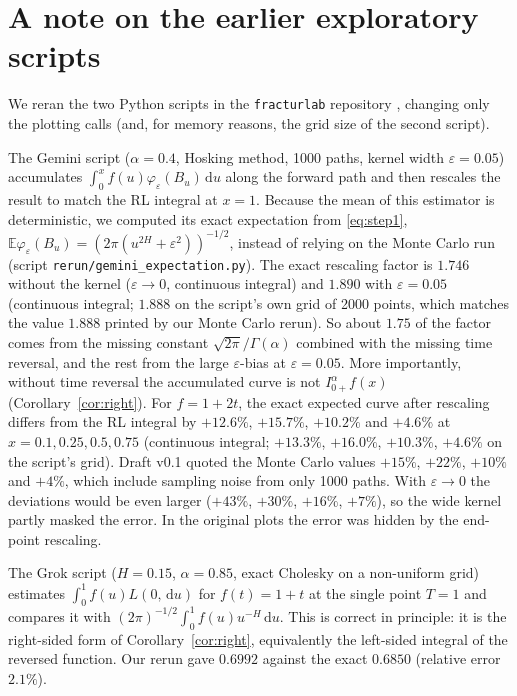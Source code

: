 \documentclass[11pt]{article}
\theoremstyle{remark}
\theoremstyle{definition}
\newcommand{\E}{\mathbb{E}}
\newcommand{\dd}{\,\mathrm{d}}
\newcommand{\Ia}{I^{\alpha}_{0+}}
\begin{document}
\section{A note on the earlier exploratory scripts}\label{sec:old}
We reran the two Python scripts in the \texttt{fracturlab} repository \cite{fracturlab}, changing only the plotting calls (and, for memory reasons, the grid size of the second script).

The Gemini script ($\alpha=0.4$, Hosking method, 1000 paths, kernel width $\varepsilon=0.05$) accumulates $\int_0^x f(u)\varphi_\varepsilon(B_u)\dd u$ along the forward path and then rescales the result to match the RL integral at $x=1$. Because the mean of this estimator is deterministic, we computed its exact expectation from \eqref{eq:step1}, $\E\varphi_\varepsilon(B_u)=(2\pi(u^{2H}+\varepsilon^2))^{-1/2}$, instead of relying on the Monte Carlo run (script \texttt{rerun/gemini\_expectation.py}). The exact rescaling factor is $1.746$ without the kernel ($\varepsilon\to0$, continuous integral) and $1.890$ with $\varepsilon=0.05$ (continuous integral; $1.888$ on the script's own grid of 2000 points, which matches the value $1.888$ printed by our Monte Carlo rerun). So about $1.75$ of the factor comes from the missing constant $\sqrt{2\pi}/\Gamma(\alpha)$ combined with the missing time reversal, and the rest from the large $\varepsilon$-bias at $\varepsilon=0.05$. More importantly, without time reversal the accumulated curve is not $\Ia f(x)$ (Corollary~\ref{cor:right}). For $f=1+2t$, the exact expected curve after rescaling differs from the RL integral by $+12.6\%$, $+15.7\%$, $+10.2\%$ and $+4.6\%$ at $x=0.1,0.25,0.5,0.75$ (continuous integral; $+13.3\%$, $+16.0\%$, $+10.3\%$, $+4.6\%$ on the script's grid). Draft v0.1 quoted the Monte Carlo values $+15\%$, $+22\%$, $+10\%$ and $+4\%$, which include sampling noise from only 1000 paths. With $\varepsilon\to0$ the deviations would be even larger ($+43\%$, $+30\%$, $+16\%$, $+7\%$), so the wide kernel partly masked the error. In the original plots the error was hidden by the end-point rescaling.

The Grok script ($H=0.15$, $\alpha=0.85$, exact Cholesky on a non-uniform grid) estimates $\int_0^1 f(u)L(0,\dd u)$ for $f(t)=1+t$ at the single point $T=1$ and compares it with $(2\pi)^{-1/2}\int_0^1 f(u)u^{-H}\dd u$. This is correct in principle: it is the right-sided form of Corollary~\ref{cor:right}, equivalently the left-sided integral of the reversed function. Our rerun gave $0.6992$ against the exact $0.6850$ (relative error $2.1\%$).
\end{document}
